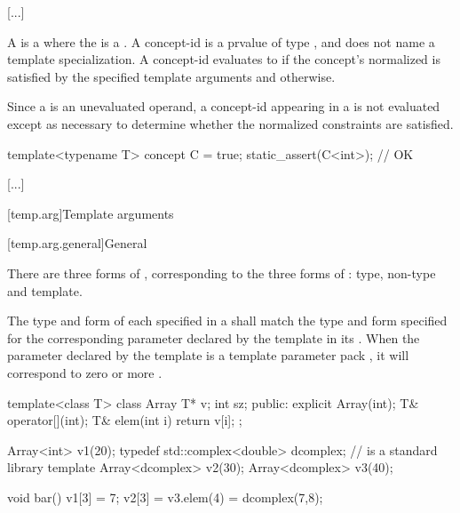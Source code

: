 \documentclass{wg21}
\begin{document}

\textcolor{noteclr}{[...]}

\pnum
A  is a 
where the  is a .
A concept-id is a prvalue of type , and
does not name a template specialization.
A concept-id evaluates to 
if the concept's
normalized  
is satisfied  by the specified template arguments and
 otherwise.
\begin{note}
    Since a  is an unevaluated operand,
    a concept-id appearing in a 
    is not evaluated except as necessary
    to determine whether the normalized constraints are satisfied.
\end{note}
\begin{example}
    \begin{codeblock}
        template<typename T> concept C = true;
        static_assert(C<int>);      // OK
    \end{codeblock}
\end{example}

\textcolor{noteclr}{[...]}


[temp.arg]{Template arguments}

[temp.arg.general]{General}


\begin{removedblock}
\pnum
{}%
There are three forms of
,
corresponding to the three forms of
:
type, non-type and template.
\end{removedblock}

The type and form of each
specified in a
shall match the type and form specified for the corresponding
parameter declared by the template in its
.
When the parameter declared by the template is a template
parameter pack , it will correspond to zero or more
.
\begin{example}
\begin{codeblock}
    template<class T> class Array {
        T* v;
        int sz;
        public:
        explicit Array(int);
        T& operator[](int);
        T& elem(int i) { return v[i]; }
    };

    Array<int> v1(20);
    typedef std::complex<double> dcomplex;  //  is a standard library template
    Array<dcomplex> v2(30);
    Array<dcomplex> v3(40);

    void bar() {
        v1[3] = 7;
        v2[3] = v3.elem(4) = dcomplex(7,8);
    }
\end{codeblock}
\end{example}
\end{document}
